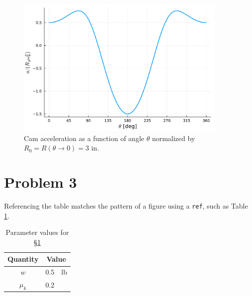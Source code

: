 \documentclass{homework}
\begin{document}
\begin{figure}[h!]
    \centering
    \includegraphics[width=4in]{examplefig}
    \caption{Cam acceleration as a function of angle $\theta$ normalized by $R_0 = R(\theta\to 0) = 3\text{ in}$.}
    \label{fig:cam:accel}
\end{figure}

\newpage
\section{Problem 3}\label{sec:p3}
Referencing the table matches the pattern of a figure using a \texttt{ref}, such as Table \ref{tab:cam}.


\begin{table}[h]
    \caption{Parameter values for \S\ref{sec:p3}}
    \label{tab:cam}
    \begin{center}
      \begin{tabular}{crl}
        \toprule
        \textbf{Quantity} & \multicolumn{2}{c}{\textbf{Value}} \\
        \midrule
        $w$     &  0.5  & lb \\
        $\mu_k$ &  0.2  &  \\
        \bottomrule
      \end{tabular}
    \end{center}
  \end{table}


\printbibliography
\end{document}
